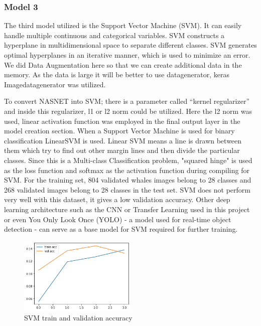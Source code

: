 \documentclass[paper=a4, fontsize=11pt]{scrartcl}
\numberwithin{equation}{section}		%
\numberwithin{table}{section}				%
\begin{document}
\pagebreak
\subsubsection {Model 3}
The third model utilized is the Support Vector Machine (SVM). It can easily handle multiple continuous and categorical variables. SVM constructs a hyperplane in multidimensional space to separate different classes. SVM generates optimal hyperplanes in an iterative manner, which is used to minimize an error. We did Data Augmentation here so that we can create additional data in the memory. As the data is large it will be better to use datagenerator, keras Imagedatagenerator was utilized. 

To convert NASNET into SVM; there is a parameter called “kernel regularizer” and inside this regularizer, l1 or l2 norm could be utilized. Here the l2 norm was used, linear activation function was employed in the final output layer in the model creation section. When a Support Vector Machine is used for binary classification LinearSVM is used. Linear SVM means a line is drawn between them which try to find out other margin lines and then divide the particular classes. Since this is a Multi-class Classification problem,  "squared hinge" is used as the loss function and softmax as the activation function during compiling for SVM. For the training set, 804 validated whales images belong to 28 classes and 268 validated images belong to 28 classes in the test set. SVM does not perform very well with this dataset, it gives a low validation accuracy. Other deep learning architecture such as the CNN or Transfer Learning used in this project or even You Only Look Once (YOLO) - a model used for real-time object detection - can serve as a base model for SVM required for further training.

\begin{figure}[!h]
    \centering
    \includegraphics[width=0.5\textwidth]{svm_train_val_acc.png}
    \caption{SVM train and validation accuracy}
    \label{fig:TLLOSS5}
\end{figure}
\end{document}
